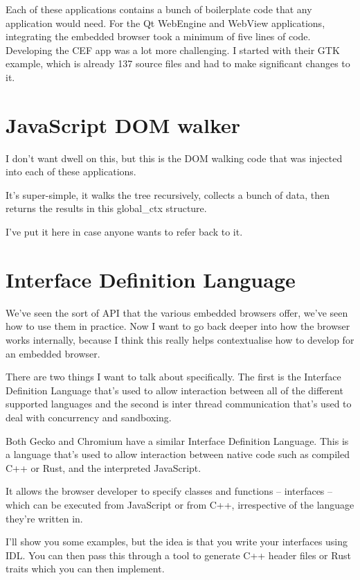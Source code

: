 \documentclass{article}
\begin{document}
Each of these applications contains a bunch of boilerplate code that any application would need. For the Qt WebEngine and WebView applications, integrating the embedded browser took a minimum of five lines of code. Developing the CEF app was a lot more challenging. I started with their GTK example, which is already 137 source files and had to make significant changes to it.


\section{JavaScript DOM walker}

I don't want dwell on this, but this is the DOM walking code that was injected into each of these applications.

It's super-simple, it walks the tree recursively, collects a bunch of data, then returns the results in this {\code global\_ctx} structure.

I've put it here in case anyone wants to refer back to it.


\section{Interface Definition Language}

We've seen the sort of API that the various embedded browsers offer, we've seen how to use them in practice. Now I want to go back deeper into how the browser works internally, because I think this really helps contextualise how to develop for an embedded browser.

There are two things I want to talk about specifically. The first is the Interface Definition Language that's used to allow interaction between all of the different supported languages and the second is inter thread communication that's used to deal with concurrency and sandboxing.

Both Gecko and Chromium have a similar Interface Definition Language. This is a language that's used to allow interaction between native code such as compiled C++ or Rust, and the interpreted JavaScript.

It allows the browser developer to specify classes and functions -- interfaces -- which can be executed from JavaScript or from C++, irrespective of the language they're written in.

I'll show you some examples, but the idea is that you write your interfaces using IDL. You can then pass this through a tool to generate C++ header files or Rust traits which you can then implement.
\end{document}
